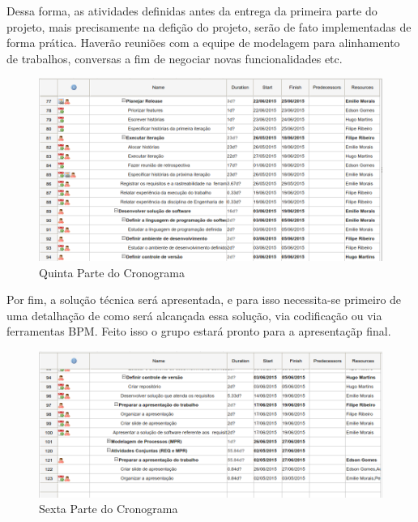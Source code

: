 Dessa forma, as atividades definidas antes da entrega da primeira parte do projeto, mais precisamente na defição do projeto, serão de fato implementadas de forma prática. Haverão reuniões com a equipe de modelagem para alinhamento de trabalhos, conversas a fim de negociar novas funcionalidades etc.

\begin{figure}[!htb]
\centering
\includegraphics[scale=0.4]{figuras/cronograma5.png}
\caption{Quinta Parte do Cronograma}
\end{figure}

Por fim, a solução técnica será apresentada, e para isso necessita-se primeiro de uma detalhação de como será alcançada essa solução, via codificação ou via ferramentas BPM. Feito isso o grupo estará pronto para a apresentaçãp final.

\begin{figure}[!htb]
\centering
\includegraphics[scale=0.55]{figuras/cronograma6.png}
\caption{Sexta Parte do Cronograma}
\end{figure}
